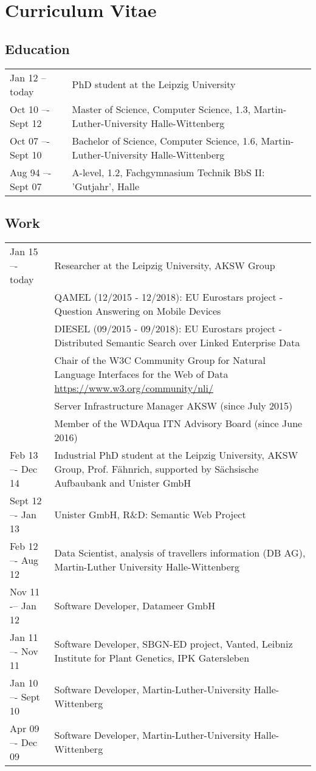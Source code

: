 \chapter{Curriculum Vitae}

\section*{Education}
\begin{tabular}{p{3cm}p{10cm}}	
Jan 12 -- today		&  	PhD student at the Leipzig University\\
Oct 10 –- Sept 12		&  	Master of Science, Computer Science, 1.3, Martin-Luther-University Halle-Wittenberg\\
Oct 07 –- Sept 10		&  	Bachelor of Science, Computer Science, 1.6, Martin-Luther-University Halle-Wittenberg\\
Aug 94 –- Sept 07		&  	A-level, 1.2, Fachgymnasium Technik BbS II: 'Gutjahr', Halle\\
\end{tabular}

\section*{Work}
\begin{tabular}{p{3cm}p{10cm}}	
Jan 15 –- today      & Researcher at the Leipzig University, AKSW Group \\
& {QAMEL} (12/2015 - 12/2018): EU Eurostars project - Question Answering on Mobile Devices\\
& {DIESEL} (09/2015 - 09/2018): EU Eurostars project - Distributed Semantic Search over Linked Enterprise Data\\
& {Chair} of the W3C Community Group for Natural Language Interfaces for the Web of Data \url{https://www.w3.org/community/nli/}\\
& {Server Infrastructure Manager AKSW} (since July 2015)\\
& Member of the WDAqua ITN Advisory Board (since June 2016)\\
Feb 13 –- Dec 14     & Industrial PhD student at the Leipzig University, AKSW Group, Prof. Fähnrich, supported by Sächsische Aufbaubank and Unister GmbH\\
Sept 12 –- Jan 13    & Unister GmbH, R\&D: Semantic Web Project\\
Feb 12 –- Aug 12	    & Data Scientist, analysis of travellers information (DB AG), Martin-Luther University Halle-Wittenberg\\
Nov 11 -– Jan 12	    & Software Developer, Datameer GmbH\\
Jan 11 –- Nov 11	    & Software Developer, SBGN-ED project, Vanted, Leibniz Institute for Plant Genetics, IPK Gatersleben\\
Jan 10 –- Sept 10	& Software Developer, Martin-Luther-University Halle-Wittenberg\\
Apr 09 –- Dec 09	& Software Developer, Martin-Luther-University Halle-Wittenberg\\
\end{tabular}

